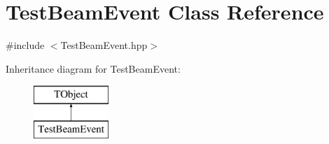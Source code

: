 \hypertarget{class_test_beam_event}{}\section{Test\+Beam\+Event Class Reference}
\label{class_test_beam_event}


{\ttfamily \#include $<$Test\+Beam\+Event.\+hpp$>$}

Inheritance diagram for Test\+Beam\+Event\+:\begin{figure}[H]
\begin{center}
\leavevmode
\includegraphics[height=2.000000cm]{class_test_beam_event}
\end{center}
\end{figure}
